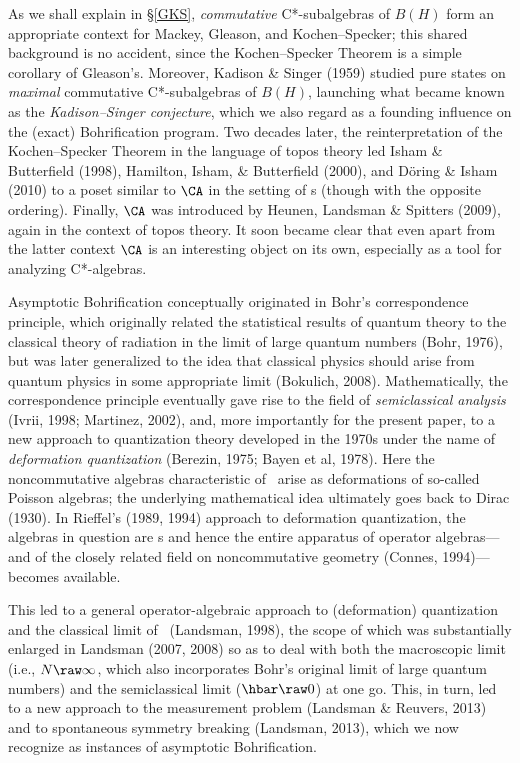\documentclass[12pt]{article}
\begin{document}
 As we shall explain in \S\ref{GKS},  \emph{commutative} C*-subalgebras of $B(H)$ form an appropriate context for Mackey, Gleason, and Kochen--Specker; this shared background is no accident, since the  Kochen--Specker Theorem is a simple corollary of Gleason's. Moreover, Kadison \& Singer (1959) studied pure states on \emph{maximal} commutative C*-subalgebras of $B(H)$, launching what became known as the \emph{Kadison--Singer conjecture}, which we also regard as a founding influence on  the (exact) Bohrification program.  
Two decades later, the reinterpretation of the  Kochen--Specker Theorem in the language of topos theory led Isham \& Butterfield (1998), Hamilton, Isham, \& Butterfield (2000), and D\"{o}ring \& Isham (2010)  to  a poset similar to $\CA$ in the setting of \vna s (though with the opposite ordering). Finally, $\CA$ was introduced by Heunen, Landsman \& Spitters (2009), again in the context of topos theory. It soon became clear that even apart from the latter context $\CA$ is an interesting object on its own, especially as a tool for analyzing C*-algebras. 
 
 Asymptotic Bohrification conceptually originated in Bohr's correspondence principle, which originally related the statistical results of quantum theory to the classical theory of radiation in the limit of large quantum numbers  (Bohr, 1976), but was later generalized to the idea that classical physics should arise from quantum physics in some appropriate limit (Bokulich, 2008).
 Mathematically, the correspondence principle eventually gave rise to the field of \emph{semiclassical analysis} (Ivrii, 1998; Martinez, 2002), and, more importantly for the present paper, to a
  new approach to quantization theory developed in the 1970s under the name of \emph{deformation quantization} (Berezin, 1975; Bayen et al, 1978).  Here  the noncommutative algebras characteristic of \qm\ arise as deformations of so-called Poisson algebras; the underlying mathematical idea ultimately goes back to Dirac (1930). In Rieffel's (1989, 1994) approach to deformation quantization, the algebras in question are \ca s and hence the entire apparatus of operator algebras---and of  the closely related field on noncommutative geometry (Connes, 1994)---becomes available. 
  
  This led to a general operator-algebraic approach to (deformation) quantization and the classical limit of \qm\ (Landsman, 1998), the scope of which was substantially enlarged in Landsman (2007, 2008) so as to deal with both the macroscopic limit  (i.e., $N\raw\infty$, which also incorporates Bohr's original limit of large quantum numbers)
and the semiclassical limit ($\hbar\raw 0$) at one go. This, in turn, led to a new approach to the measurement problem (Landsman \& Reuvers, 2013) and to spontaneous symmetry breaking (Landsman, 2013), which we now recognize as instances of  asymptotic Bohrification.
\end{document}
